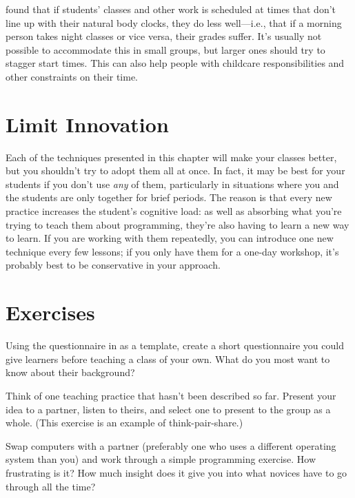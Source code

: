 \cite{Smar2018} found that if students' classes and other work is
scheduled at times that don't line up with their natural body clocks,
they do less well---i.e., that if a morning person takes night classes
or vice versa, their grades suffer.  It's usually not possible to
accommodate this in small groups, but larger ones should try to
stagger start times.  This can also help people with childcare
responsibilities and other constraints on their time.

\section{Limit Innovation}\label{s:classroom-innovate}

Each of the techniques presented in this chapter will make your
classes better, but you shouldn't try to adopt them all at once.  In
fact, it may be best for your students if you don't use \emph{any} of
them, particularly in situations where you and the students are only
together for brief periods.  The reason is that every new practice
increases the student's cognitive load: as well as absorbing what
you're trying to teach them about programming, they're also having to
learn a new way to learn.  If you are working with them repeatedly,
you can introduce one new technique every few lessons; if you only
have them for a one-day workshop, it's probably best to be
conservative in your approach.

\section{Exercises}\label{s:classroom-exercises}


Using the questionnaire in  as a template, create
a short questionnaire you could give learners before teaching a class
of your own. What do you most want to know about their background?


Think of one teaching practice that hasn't been described so far.
Present your idea to a partner, listen to theirs, and select one to
present to the group as a whole.  (This exercise is an example of
think-pair-share.)


Swap computers with a partner (preferably one who uses a different
operating system than you) and work through a simple programming
exercise.  How frustrating is it?  How much insight does it give you
into what novices have to go through all the time?

